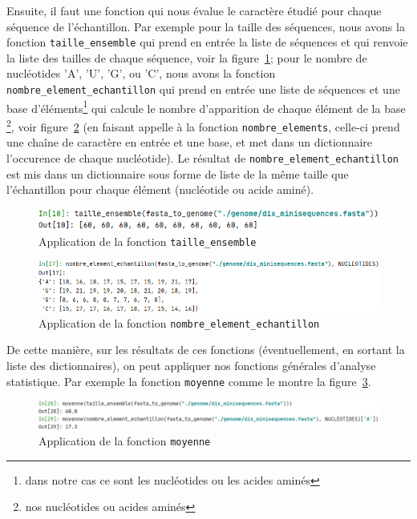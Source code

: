 \documentclass[12pt]{article}
\begin{document}
Ensuite, il faut une fonction qui nous évalue le caractère étudié pour chaque séquence de l'échantillon. Par exemple pour la taille des séquences, nous avons la fonction \texttt{taille\_ensemble} qui prend en entrée la liste de séquences et qui renvoie la liste des tailles de chaque séquence, voir la figure~\ref{apptaille}; pour le nombre de nucléotides 'A', 'U', 'G', ou 'C', nous avons la fonction \texttt{nombre\_element\_echantillon} qui prend en entrée une liste de séquences et une base d'éléments\footnote{dans notre cas ce sont les nucléotides ou les acides aminés} qui calcule le nombre d'apparition de chaque élément de la base \footnote{nos nucléotides ou acides aminés}, voir figure~\ref{appnbelech} (en faisant appelle à la fonction \texttt{nombre\_elements}, celle-ci prend une chaîne de caractère en entrée et une base, et met dans un dictionnaire l'occurence de chaque nucléotide). Le résultat de \texttt{nombre\_element\_echantillon} est mis dans un dictionnaire sous forme de liste de la même taille que l'échantillon pour chaque élément (nucléotide ou acide aminé).
    \begin{figure}[!h]
        \centering
        \includegraphics[scale = 0.85]{Images/Stats/app_taille_ensemble.PNG}
        \caption{Application de la fonction \texttt{taille\_ensemble}}
        \label{apptaille}
    \end{figure}
    \begin{figure}[!h]
        \centering
        \includegraphics[scale = 0.85]{Images/Stats/app_nombre_element_echantillon.PNG}
        \caption{Application de la fonction \texttt{nombre\_element\_echantillon}}
        \label{appnbelech}
    \end{figure}

De cette manière, sur les résultats de ces fonctions (éventuellement, en sortant la liste des dictionnaires), on peut appliquer nos fonctions générales d'analyse statistique. Par exemple la fonction \texttt{moyenne} comme le montre la figure~\ref{appmoy}.
    \begin{figure}[!h]
        \centering
        \includegraphics[scale = 0.8]{Images/Stats/app_moyenne.PNG}
        \caption{Application de la fonction \texttt{moyenne}}
        \label{appmoy}
    \end{figure}
\end{document}
